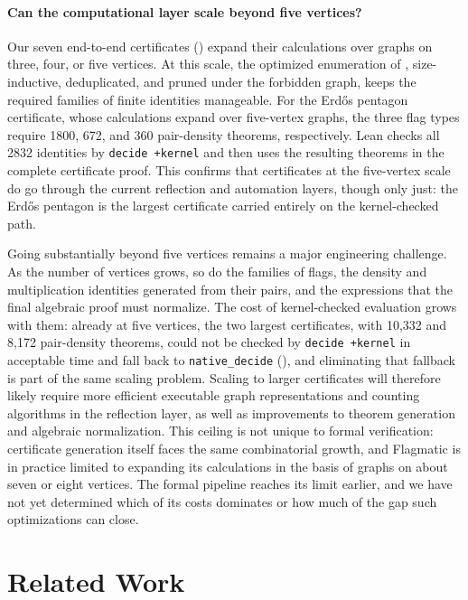 \documentclass{article}
\newcommand{\lean}[1]{\texttt{#1}}
\begin{document}
\paragraph{Can the computational layer scale beyond five vertices?}
Our seven end-to-end certificates () expand their
calculations over graphs on three, four, or five vertices.  At this scale,
the optimized enumeration of , size-inductive,
deduplicated, and pruned under the forbidden graph, keeps the required
families of finite identities manageable.  For the Erd\H{o}s pentagon
certificate, whose calculations expand over five-vertex graphs, the three
flag types require 1800, 672, and 360 pair-density theorems, respectively.
Lean checks all 2832 identities by \lean{decide +kernel} and then uses the
resulting theorems in the complete certificate proof.  This confirms that
certificates at the five-vertex scale do go through the current reflection
and automation layers, though only just: the Erd\H{o}s pentagon is the
largest certificate carried entirely on the kernel-checked path.

Going substantially beyond five vertices remains a major engineering
challenge.  As the number of vertices grows, so do the families of flags,
the density and multiplication identities generated from their pairs, and the
expressions that the final algebraic proof must normalize.  The cost of
kernel-checked evaluation grows with them: already at five vertices, the two
largest certificates, with 10,332 and 8,172 pair-density theorems, could not
be checked by \lean{decide +kernel} in acceptable time and fall back to
\lean{native\_decide} (), and eliminating that
fallback is part of the same scaling problem.  Scaling to larger
certificates will therefore likely require more efficient executable graph
representations and counting algorithms in the reflection layer, as well as
improvements to theorem generation and algebraic normalization.  This
ceiling is not unique to formal verification: certificate generation itself
faces the same combinatorial growth, and Flagmatic is in practice limited to
expanding its calculations in the basis of graphs on about seven or eight
vertices.  The formal pipeline reaches its
limit earlier, and we have not yet determined which of its costs dominates
or how much of the gap such optimizations can close.

\section{Related Work}
\label{sec:related}
\end{document}
